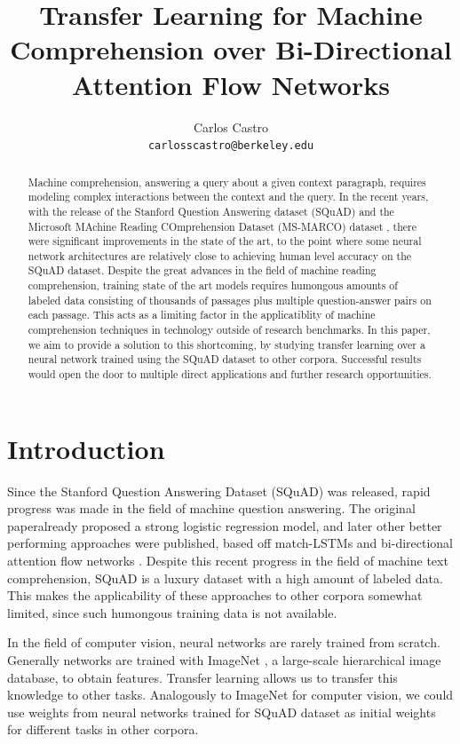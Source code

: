 \documentclass[11pt,a4paper]{article}
\title{Transfer Learning for Machine Comprehension over Bi-Directional Attention Flow Networks}
\author{Carlos Castro \\
  {\tt carlosscastro@berkeley.edu} }
\date{}
\begin{document}
\maketitle
\begin{abstract}

Machine comprehension, answering a query about a given context paragraph, requires modeling complex interactions between the context and the query. In the recent years, with the release of the  Stanford Question Answering dataset (SQuAD) \cite{squad:2016} and the Microsoft MAchine Reading COmprehension Dataset (MS-MARCO) dataset \cite{msmarco:2016}, there were significant improvements in the state of the art, to the point where some neural network architectures are relatively close to achieving human level accuracy on the SQuAD dataset. Despite the great advances in the field of machine reading comprehension, training state of the art models requires humongous amounts of labeled data consisting of thousands of passages plus multiple question-answer pairs on each passage. This acts as a limiting factor in the applicatiblity of machine comprehension techniques in technology outside of research benchmarks. In this paper, we aim to provide a solution to this shortcoming, by studying transfer learning over a neural network trained using the SQuAD dataset to other corpora. Successful results would open the door to multiple direct applications and further research opportunities.

\end{abstract}


\section{Introduction}

Since the Stanford Question Answering Dataset (SQuAD) \cite{squad:2016} was released, rapid progress was made in the field of machine question answering. The original paperalready proposed a strong logistic regression model, and later other better performing approaches were published, based off match-LSTMs \cite{matchlstm} and bi-directional attention flow networks \cite{bidaf:2017}. Despite this recent progress in the field of machine text comprehension, SQuAD is a luxury dataset with a high amount of labeled data. This makes the applicability of these approaches to other corpora somewhat limited, since such humongous training data is not available. 

In the field of computer vision, neural networks are rarely trained from scratch. Generally networks are trained with ImageNet \cite{imagenet}, a large-scale hierarchical image database, to obtain features. Transfer learning allows us to transfer this knowledge to other tasks. Analogously to ImageNet for computer vision, we could use weights from neural networks trained for SQuAD dataset as initial weights for different tasks in other corpora. 
\end{document}
